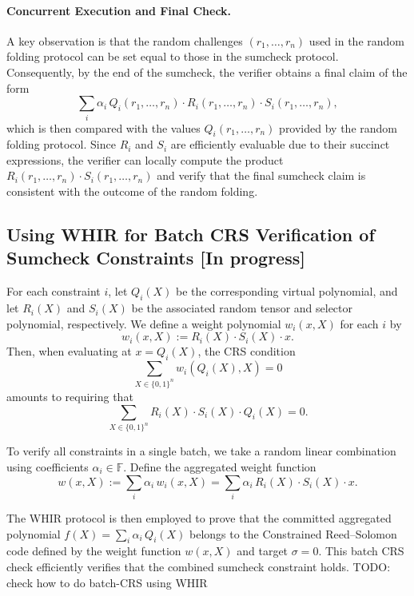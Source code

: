 \documentclass{article}
\begin{document}
\paragraph{Concurrent Execution and Final Check.}  
A key observation is that the random challenges \( (r_1, \dots, r_n) \) used in the random folding protocol can be set equal to those in the sumcheck protocol. Consequently, by the end of the sumcheck, the verifier obtains a final claim of the form
\[
\sum_i \alpha_i \, Q_i(r_1,\dots,r_n) \cdot R_i(r_1,\dots,r_n) \cdot S_i(r_1,\dots,r_n),
\]
which is then compared with the values \( Q_i(r_1,\dots,r_n) \) provided by the random folding protocol. Since \( R_i \) and \( S_i \) are efficiently evaluable due to their succinct expressions, the verifier can locally compute the product \( R_i(r_1,\dots,r_n) \cdot S_i(r_1,\dots,r_n) \) and verify that the final sumcheck claim is consistent with the outcome of the random folding.


\subsection{Using WHIR for Batch CRS Verification of Sumcheck Constraints [In progress]}

For each constraint \(i\), let \( Q_i(X) \) be the corresponding virtual polynomial, and let \( R_i(X) \) and \( S_i(X) \) be the associated random tensor and selector polynomial, respectively. We define a weight polynomial \( w_i(x, X) \) for each \(i\) by
\[
w_i(x, X) := R_i(X) \cdot S_i(X) \cdot x.
\]
Then, when evaluating at \(x = Q_i(X)\), the CRS condition
\[
\sum_{X \in \{0,1\}^n} w_i(Q_i(X), X) = 0
\]
amounts to requiring that
\[
\sum_{X \in \{0,1\}^n} R_i(X) \cdot S_i(X) \cdot Q_i(X) = 0.
\]

To verify all constraints in a single batch, we take a random linear combination using coefficients \(\alpha_i \in \mathbb{F}\). Define the aggregated weight function
\[
w(x, X) := \sum_i \alpha_i\, w_i(x, X) = \sum_i \alpha_i\, R_i(X) \cdot S_i(X) \cdot x.
\]

The WHIR protocol is then employed to prove that the committed aggregated polynomial \( f(X) = \sum_i \alpha_i\, Q_i(X) \) belongs to the Constrained Reed--Solomon code defined by the weight function \( w(x, X) \) and target \(\sigma = 0\). This batch CRS check efficiently verifies that the combined sumcheck constraint holds. TODO: check how to do batch-CRS using WHIR
\end{document}
